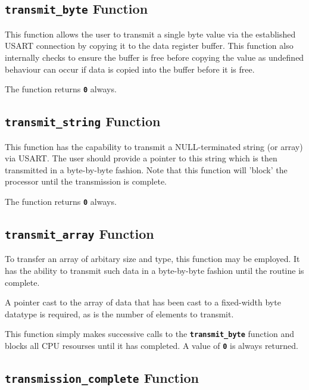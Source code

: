 \documentclass[a4paper, oneside, 11pt, titlepage, onecolumn, openright]{report}
\begin{document}
{{\subsection{\textbf{\texttt{transmit\_byte}} Function}
			\label{ss:HALusarttransmit_byteFunction}
			
			This function allows the user to transmit a single byte value via the established USART connection by copying it to the data register buffer. This function also internally checks to ensure the buffer is free before copying the value as undefined behaviour can occur if data is copied into the buffer before it is free.
			
			The function returns \textbf{\texttt{0}} always.
			
\subsection{\textbf{\texttt{transmit\_string}} Function}
			\label{ss:HALusarttransmit_stringFunction}
			
			This function has the capability to transmit a NULL-terminated string (or array) via USART. The user should provide a pointer to this string which is then transmitted in a byte-by-byte fashion. Note that this function will 'block' the processor until the transmission is complete.
			
			The function returns \textbf{\texttt{0}} always.
			
\subsection{\textbf{\texttt{transmit\_array}} Function}
			\label{ss:HALusarttransmit_arrayFunction}
			
			To transfer an array of arbitary size and type, this function may be employed. It has the ability to transmit such data in a byte-by-byte fashion until the routine is complete.
			
			A pointer cast to the array of data that has been cast to a fixed-width byte datatype is required, as is the number of elements to transmit.
			
			This function simply makes successive calls to the \textbf{\texttt{transmit\_byte}} function and blocks all CPU resourses until it has completed. A value of \textbf{\texttt{0}} is always returned. 
			
\subsection{\textbf{\texttt{transmission\_complete}} Function}
			\label{ss:HALusarttransmission_completeFunction}
			
}}
\end{document}
